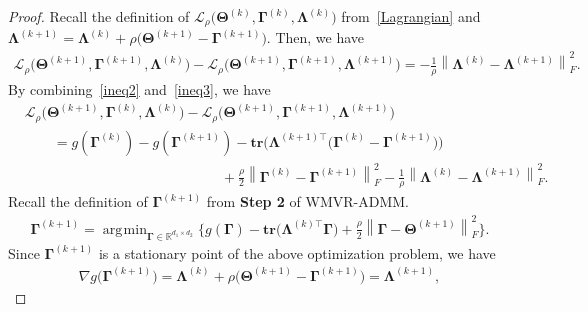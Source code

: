 \documentclass[alpha-refs]{wiley-article}
\DeclareMathOperator*{\argmin}{\arg\!\min}
\begin{document}
\begin{proof}
Recall the definition of $\mathcal{L}_{\rho} \big( \boldsymbol{\Theta}^{(k)},\boldsymbol{\Gamma}^{(k)},\boldsymbol{\Lambda}^{(k)} \big)$ from~\eqref{Lagrangian} and $\boldsymbol{\Lambda}^{(k+1)}=\boldsymbol{\Lambda}^{(k)}+\rho\big(\boldsymbol{\Theta}^{(k+1)}-\boldsymbol{\Gamma}^{(k+1)}\big)$.
Then, we have
\begin{align} \label{ineq3}
    \mathcal{L}_{\rho} \big( \boldsymbol{\Theta}^{(k+1)},\boldsymbol{\Gamma}^{(k+1)},\boldsymbol{\Lambda}^{(k)} \big)
    - \mathcal{L}_{\rho} \big( \boldsymbol{\Theta}^{(k+1)},\boldsymbol{\Gamma}^{(k+1)},\boldsymbol{\Lambda}^{(k+1)} \big)
    = -\frac{1}{\rho}\left\| \boldsymbol{\Lambda}^{(k)}-\boldsymbol{\Lambda}^{(k+1)} \right\|_{F}^{2}.
\end{align}
By combining~\eqref{ineq2} and~\eqref{ineq3}, we have
\begin{align} \label{ineq4}
    &\mathcal{L}_{\rho} \big( \boldsymbol{\Theta}^{(k+1)},\boldsymbol{\Gamma}^{(k)},\boldsymbol{\Lambda}^{(k)} \big)
    - \mathcal{L}_{\rho} \big( \boldsymbol{\Theta}^{(k+1)},\boldsymbol{\Gamma}^{(k+1)},\boldsymbol{\Lambda}^{(k+1)} \big) \nonumber \\
    &\qquad = g(\boldsymbol{\Gamma}^{(k)})-g(\boldsymbol{\Gamma}^{(k+1)}) - \textbf{tr}\big( \boldsymbol{\Lambda}^{(k+1)\top}\big(\boldsymbol{\Gamma}^{(k)}-\boldsymbol{\Gamma}^{(k+1)}\big)\big) \nonumber \\
    &\qquad \qquad \qquad \qquad \qquad \qquad \qquad
    + \frac{\rho}{2}\left\| \boldsymbol{\Gamma}^{(k)}-\boldsymbol{\Gamma}^{(k+1)} \right\|_{F}^{2} -\frac{1}{\rho}\left\| \boldsymbol{\Lambda}^{(k)}-\boldsymbol{\Lambda}^{(k+1)} \right\|_{F}^{2}.
\end{align}
Recall the definition of $\boldsymbol{\Gamma}^{(k+1)}$ from \textbf{Step 2} of WMVR-ADMM.
\begin{align*}
    \boldsymbol{\Gamma}^{(k+1)} = \argmin_{\boldsymbol{\Gamma} \in \mathbb{R}^{d_{1} \times d_{2}}}
    \bigg\{ g(\boldsymbol{\Gamma}) - \textbf{tr}\big(\boldsymbol{\Lambda}^{(k)\top}\boldsymbol{\Gamma}\big)+\frac{\rho}{2}\left\|\boldsymbol{\Gamma}-\boldsymbol{\Theta}^{(k+1)} \right\|_{F}^{2} \bigg\}.
\end{align*}
Since $\boldsymbol{\Gamma}^{(k+1)}$ is a stationary point of the above optimization problem, we have
\begin{align*}
    \nabla g\big( \boldsymbol{\Gamma}^{(k+1)} \big)
    = \boldsymbol{\Lambda}^{(k)} + \rho\big( \boldsymbol{\Theta}^{(k+1)}-\boldsymbol{\Gamma}^{(k+1)} \big)
    = \boldsymbol{\Lambda}^{(k+1)},
\end{align*}

\end{proof}
\end{document}

